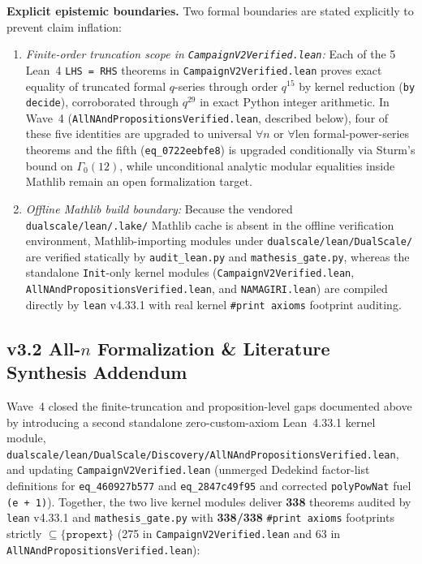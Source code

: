 \documentclass[11pt,a4paper]{article}
\theoremstyle{plain}
\theoremstyle{definition}
\theoremstyle{remark}
\begin{document}
\noindent\textbf{Explicit epistemic boundaries.}
Two formal boundaries are stated explicitly to prevent claim inflation:
\begin{enumerate}
  \item \emph{Finite-order truncation scope in \texttt{CampaignV2Verified.lean}:} Each of the 5 Lean~4
    \texttt{LHS = RHS} theorems in \texttt{CampaignV2Verified.lean} proves
    exact equality of truncated formal $q$-series through order $q^{15}$ by
    kernel reduction (\texttt{by decide}), corroborated through $q^{29}$ in
    exact Python integer arithmetic. In Wave~4 (\texttt{AllNAndPropositionsVerified.lean}, described below),
    four of these five identities are upgraded to universal $\forall n$ or $\forall \text{len}$
    formal-power-series theorems and the fifth (\texttt{eq\_0722eebfe8}) is upgraded
    conditionally via Sturm's bound on $\Gamma_0(12)$, while unconditional analytic
    modular equalities inside Mathlib remain an open formalization target.
  \item \emph{Offline Mathlib build boundary:} Because the vendored
    \texttt{dualscale/lean/.lake/} Mathlib cache is absent in the offline
    verification environment, Mathlib-importing modules under
    \texttt{dualscale/lean/DualScale/} are verified statically by
    \texttt{audit\_lean.py} and \texttt{mathesis\_gate.py}, whereas the
    standalone \texttt{Init}-only kernel modules
    (\texttt{CampaignV2Verified.lean}, \texttt{AllNAndPropositionsVerified.lean},
    and \texttt{NAMAGIRI.lean}) are
    compiled directly by \texttt{lean} v4.33.1 with real kernel
    \texttt{\#print axioms} footprint auditing.
\end{enumerate}

\subsection*{v3.2 All-$n$ Formalization \& Literature Synthesis Addendum}

Wave~4 closed the finite-truncation and proposition-level gaps documented above by introducing a second standalone zero-custom-axiom Lean~4.33.1 kernel module, \texttt{dualscale/lean/DualScale/Discovery/AllNAndPropositionsVerified.lean}, and updating \texttt{CampaignV2Verified.lean} (unmerged Dedekind factor-list definitions for \texttt{eq\_460927b577} and \texttt{eq\_2847c49f95} and corrected \texttt{polyPowNat} fuel \texttt{(e + 1)}). Together, the two live kernel modules deliver \textbf{338} theorems audited by \texttt{lean} v4.33.1 and \texttt{mathesis\_gate.py} with \textbf{338/338} \texttt{\#print axioms} footprints strictly $\subseteq \{\texttt{propext}\}$ (275 in \texttt{CampaignV2Verified.lean} and 63 in \texttt{AllNAndPropositionsVerified.lean}):
\end{document}
